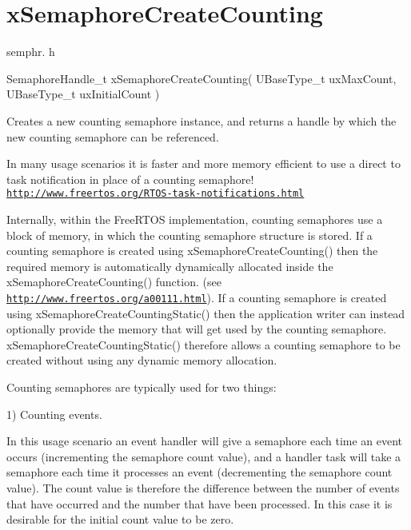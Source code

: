 \hypertarget{group__xSemaphoreCreateCounting}{}\section{x\+Semaphore\+Create\+Counting}
\label{group__xSemaphoreCreateCounting}
semphr. h 
\begin{DoxyPre}SemaphoreHandle\_t xSemaphoreCreateCounting( UBaseType\_t uxMaxCount, UBaseType\_t uxInitialCount )\end{DoxyPre}


Creates a new counting semaphore instance, and returns a handle by which the new counting semaphore can be referenced.

In many usage scenarios it is faster and more memory efficient to use a direct to task notification in place of a counting semaphore! \href{http://www.freertos.org/RTOS-task-notifications.html}{\tt http\+://www.\+freertos.\+org/\+R\+T\+O\+S-\/task-\/notifications.\+html}

Internally, within the Free\+R\+T\+OS implementation, counting semaphores use a block of memory, in which the counting semaphore structure is stored. If a counting semaphore is created using x\+Semaphore\+Create\+Counting() then the required memory is automatically dynamically allocated inside the x\+Semaphore\+Create\+Counting() function. (see \href{http://www.freertos.org/a00111.html}{\tt http\+://www.\+freertos.\+org/a00111.\+html}). If a counting semaphore is created using x\+Semaphore\+Create\+Counting\+Static() then the application writer can instead optionally provide the memory that will get used by the counting semaphore. x\+Semaphore\+Create\+Counting\+Static() therefore allows a counting semaphore to be created without using any dynamic memory allocation.

Counting semaphores are typically used for two things\+:

1) Counting events.

In this usage scenario an event handler will \textquotesingle{}give\textquotesingle{} a semaphore each time an event occurs (incrementing the semaphore count value), and a handler task will \textquotesingle{}take\textquotesingle{} a semaphore each time it processes an event (decrementing the semaphore count value). The count value is therefore the difference between the number of events that have occurred and the number that have been processed. In this case it is desirable for the initial count value to be zero.

